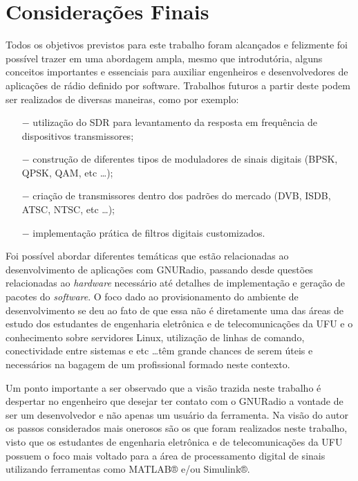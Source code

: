 \documentclass[
  12pt,				%
  openright,			%
  twoside,			%
  a4paper,			%
  english,			%
  french,				%
  spanish,			%
  brazil,				%
  ]{abntex2}
\begin{document}
\chapter{Considerações Finais}

Todos os objetivos previstos para este trabalho foram alcançados e felizmente foi possível trazer em uma abordagem ampla, mesmo que introdutória, alguns conceitos importantes e essenciais
para auxiliar engenheiros e desenvolvedores de aplicações de rádio definido por software. Trabalhos futuros a partir deste podem ser realizados de diversas maneiras, como por exemplo:

\begin{itemize}
  \item[$-$] utilização do SDR para levantamento da resposta em frequência de dispositivos transmissores;
  \item[$-$] construção de diferentes tipos de moduladores de sinais digitais (BPSK, QPSK, QAM, etc \ldots);
  \item[$-$] criação de transmissores dentro dos padrões do mercado (DVB, ISDB, ATSC, NTSC, etc \ldots);
  \item[$-$] implementação prática de filtros digitais customizados.
\end{itemize}

Foi possível abordar diferentes temáticas que estão relacionadas ao desenvolvimento de aplicações com GNURadio, passando desde questões relacionadas ao \textit{hardware} necessário até detalhes
de implementação e geração de pacotes do \textit{software}. O foco dado ao provisionamento do ambiente de desenvolvimento se deu ao fato de que essa não é diretamente uma das áreas de estudo dos
estudantes de engenharia eletrônica e de telecomunicações da UFU e o conhecimento sobre servidores Linux, utilização de linhas de comando, conectividade entre sistemas e etc \ldots têm grande chances
de serem úteis e necessários na bagagem de um profissional formado neste contexto.

Um ponto importante a ser observado que a visão trazida neste trabalho é despertar no engenheiro que desejar ter contato com o GNURadio a vontade de ser um desenvolvedor e não apenas um usuário
da ferramenta. Na visão do autor os passos considerados mais onerosos são os que foram realizados neste trabalho, visto que os estudantes de engenharia eletrônica e de telecomunicações da UFU
possuem o foco mais voltado para a área de processamento digital de sinais utilizando ferramentas como MATLAB® e/ou Simulink®.
\end{document}
